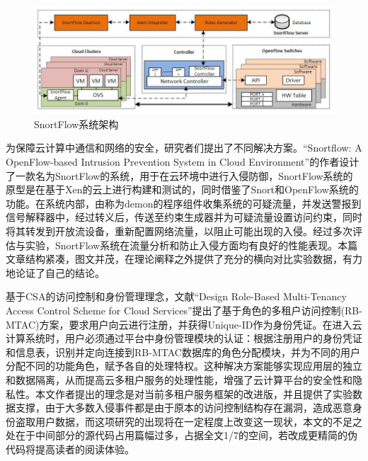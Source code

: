 \documentclass[a4paper, 12pt, conference]{ieeeconf}      %
\begin{document}
\begin{figure}[hb]
	\centering
	\includegraphics[width=6in]{pic/图3}
	\caption{SnortFlow系统架构}
	\label{fig:3}
\end{figure}


为保障云计算中通信和网络的安全，研究者们提出了不同解决方案。“Snortflow: A OpenFlow-based Intrusion Prevention System in Cloud Environment”的作者设计了一款名为SnortFlow的系统，用于在云环境中进行入侵防御，SnortFlow系统的原型是在基于Xen的云上进行构建和测试的，同时借鉴了Snort和OpenFlow系统的功能\cite{xing2013snortflow}。在系统内部，由称为demon的程序组件收集系统的可疑流量，并发送警报到信号解释器中，经过转义后，传送至约束生成器并为可疑流量设置访问约束，同时将其转发到开放流设备，重新配置网络流量，以阻止可能出现的入侵。经过多次评估与实验，SnortFlow系统在流量分析和防止入侵方面均有良好的性能表现。本篇文章结构紧凑，图文并茂，在理论阐释之外提供了充分的横向对比实验数据，有力地论证了自己的结论。



基于CSA的访问控制和身份管理理念，文献“Design Role-Based Multi-Tenancy Access Control Scheme for Cloud Services”提出了基于角色的多租户访问控制(RB-MTAC)方案，要求用户向云进行注册，并获得Unique-ID作为身份凭证。在进入云计算系统时，用户必须通过平台中身份管理模块的认证：根据注册用户的身份凭证和信息表，识别并定向连接到RB-MTAC数据库的角色分配模块，并为不同的用户分配不同的功能角色，赋予各自的处理特权。这种解决方案能够实现应用层的独立和数据隔离，从而提高云多租户服务的处理性能，增强了云计算平台的安全性和隐私性\cite{yang2013design}。本文作者提出的理念是对当前多租户服务框架的改进版，并且提供了实验数据支撑，由于大多数入侵事件都是由于原本的访问控制结构存在漏洞，造成恶意身份盗取用户数据，而这项研究的出现将在一定程度上改变这一现状，本文的不足之处在于中间部分的源代码占用篇幅过多，占据全文1/7的空间，若改成更精简的伪代码将提高读者的阅读体验。
\end{document}

